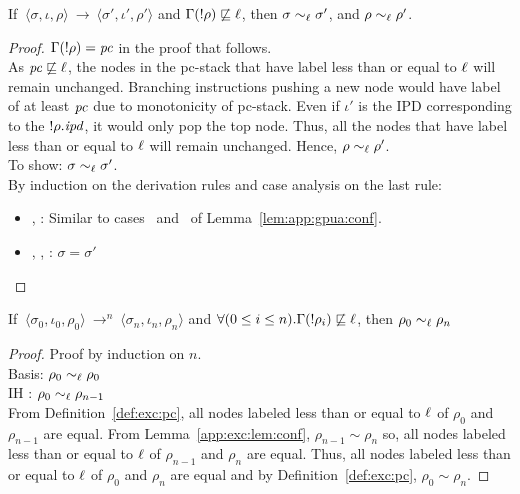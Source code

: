\begin{myLemma}
\label{app:exc:lem:conf}
If $~\langle \sigma, \iota, \rho \rangle~\rightarrow~\langle \sigma',
\iota', \rho' \rangle$ and $\Gamma(!\rho) \not\sqsubseteq \ell$, then
$\sigma \sim_\ell \sigma'$, and $\rho \sim_\ell \rho'$.
\end{myLemma}
\begin{proof}
$\Gamma(!\rho) = \mathit{pc}$ in the proof that follows.\\
As $\mathit{pc} \not\sqsubseteq \ell$, the nodes in the pc-stack 
that have label less than or equal to $\ell$ will remain
unchanged. Branching instructions pushing a new node would have label
of at least $\mathit{pc}$ due to monotonicity of pc-stack. Even if
$\iota'$ is the IPD corresponding to the $!\rho.\mathit{ipd}$, it would only
pop the top node. Thus, all the nodes that have label less than or
equal to $\ell$ will remain unchanged. Hence, $\rho \sim_\ell \rho'$.\\
To show: $\sigma \sim_\ell \sigma'$. \\
By induction on the derivation rules and case analysis on the last rule: 
\begin{itemize}
\item {}, : Similar to cases~
  and~ of Lemma~\ref{lem:app:gpua:conf}.
\item {}, , : $\sigma = \sigma'$
\end{itemize}
\end{proof}

\begin{myLemma}
\label{app:exc:lem:pcstack}
If $~\langle \sigma_0, \iota_0, \rho_0 \rangle~\rightarrow^{n}~\langle
\sigma_n, \iota_n, \rho_n \rangle$ and $\forall (0 \leq i \leq
n).\Gamma(!\rho_i) \not\sqsubseteq \ell$, then  $\rho_0 \sim_\ell \rho_n$
\end{myLemma}
\begin{proof}
Proof by induction on $n$. \\
Basis: $\rho_0 \sim_\ell \rho_0$\\
IH : $\rho_0 \sim_\ell \rho_{n-1}$\\
From Definition~\ref{def:exc:pc}, all nodes labeled less than or equal
to $\ell$ of $\rho_0$ and $\rho_{n-1}$ are equal. From
Lemma~\ref{app:exc:lem:conf}, $\rho_{n-1} \sim \rho_n$ so, all nodes
labeled less than or equal to $\ell$ of $\rho_{n-1}$ and $\rho_n$ are
equal. Thus, all nodes labeled less than or equal to $\ell$ of
$\rho_0$ and $\rho_n$ are equal and by Definition~\ref{def:exc:pc},
$\rho_0 \sim \rho_n$.
\end{proof}

